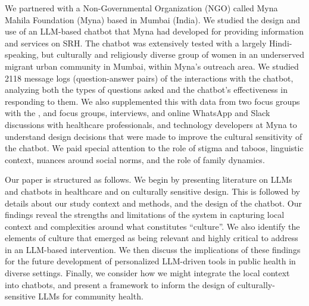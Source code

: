 We partnered with a Non-Governmental Organization (NGO) called Myna Mahila Foundation (Myna) based in Mumbai (India). We studied the design and use of an LLM-based chatbot that Myna had developed for providing information and services on SRH. 
The chatbot was extensively tested with a largely Hindi-speaking, but culturally and religiously diverse group of women  in an underserved migrant urban community in Mumbai, within Myna's outreach area.
We  studied 2118 message logs (question-answer pairs) of the   interactions with the chatbot, analyzing both the types of questions asked and the chatbot's effectiveness in responding to them. We also supplemented this with data from two focus groups with the , and focus groups, interviews, and online WhatsApp and Slack discussions with healthcare professionals, and technology developers at Myna to understand design decisions that were made to improve the cultural sensitivity of the chatbot. 
We paid special attention to the role of stigma and taboos, linguistic context, nuances around social norms, and the role of family dynamics. 

Our paper is structured as follows. We begin by presenting literature on LLMs and chatbots in healthcare and on culturally sensitive design. This is followed by details about our study context and methods, and the design of the chatbot. 
Our findings reveal the strengths and limitations of the system in capturing local context and complexities around
what constitutes ``culture''.
We also identify the elements of culture that emerged as being relevant and highly critical to address in an LLM-based intervention. 
We then discuss the implications of these findings for the future development of personalized LLM-driven tools in public health in diverse settings.
Finally, we consider how we might integrate the local context into chatbots, and present a framework to inform the design of culturally-sensitive LLMs for community health.
